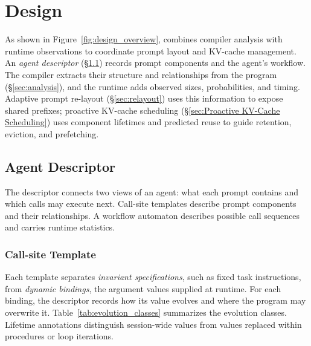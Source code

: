 \section{Design}
\label{sec:design}

As shown in Figure~\ref{fig:design_overview}, \sysname combines compiler analysis with runtime observations to coordinate prompt layout and KV-cache management. An \emph{agent descriptor} (\S\ref{sec:agent_descriptor}) records prompt components and the agent's workflow. The compiler extracts their structure and relationships from the program (\S\ref{sec:analysis}), and the runtime adds observed sizes, probabilities, and timing. Adaptive prompt re-layout (\S\ref{sec:relayout}) uses this information to expose shared prefixes; proactive KV-cache scheduling (\S\ref{sec:Proactive KV-Cache Scheduling}) uses component lifetimes and predicted reuse to guide retention, eviction, and prefetching.

\subsection{Agent Descriptor}
\label{sec:agent_descriptor}

The descriptor connects two views of an agent: what each prompt contains and which calls may execute next. Call-site templates describe prompt components and their relationships. A workflow automaton describes possible call sequences and carries runtime statistics.

\subsubsection{Call-site Template}
\label{sec:template}

Each template separates \emph{invariant specifications}, such as fixed task instructions, from \emph{dynamic bindings}, the argument values supplied at runtime. For each binding, the descriptor records how its value evolves and where the program may overwrite it. Table~\ref{tab:evolution_classes} summarizes the evolution classes. Lifetime annotations distinguish session-wide values from values replaced within procedures or loop iterations.

